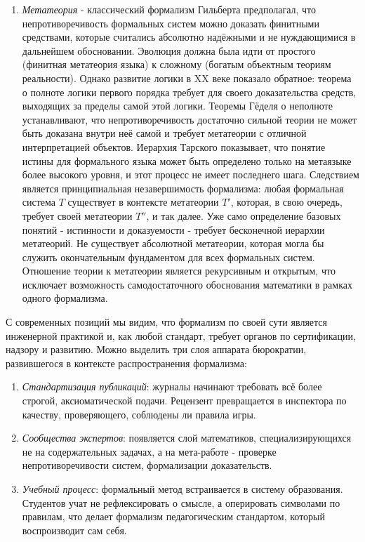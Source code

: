 \documentclass[12pt]{article}
\begin{document}
\begin{enumerate}
    \item {\it Метатеория} - классический формализм Гильберта предполагал, что непротиворечивость формальных систем можно доказать финитными средствами, которые считались абсолютно надёжными и не нуждающимися в дальнейшем обосновании. Эволюция должна была идти от простого (финитная метатеория языка) к сложному (богатым объектным теориям реальности). Однако развитие логики в XX веке показало обратное: теорема о полноте логики первого порядка требует для своего доказательства средств, выходящих за пределы самой этой логики. Теоремы Гёделя о неполноте устанавливают, что непротиворечивость достаточно сильной теории не может быть доказана внутри неё самой и требует метатеории с отличной интерпретацией объектов. Иерархия Тарского показывает, что понятие истины для формального языка может быть определено только на метаязыке более высокого уровня, и этот процесс не имеет последнего шага. Следствием является принципиальная незавершимость формализма: любая формальная система $T$ существует в контексте метатеории $T'$, которая, в свою очередь, требует своей метатеории $T''$, и так далее. Уже само определение базовых понятий - истинности и доказуемости - требует бесконечной иерархии метатеорий. Не существует абсолютной метатеории, которая могла бы служить окончательным фундаментом для всех формальных систем. Отношение теории к метатеории является рекурсивным и открытым, что исключает возможность самодостаточного обоснования математики в рамках одного формализма.
\end{enumerate}

С современных позиций мы видим, что формализм по своей сути является инженерной практикой и, как любой стандарт, требует органов по сертификации, надзору и развитию. Можно выделить три слоя аппарата бюрократии, развившегося в контексте распространения формализма:

\begin{enumerate}
    \item {\it Стандартизация публикаций}: журналы начинают требовать всё более строгой, аксиоматической подачи. Рецензент превращается в инспектора по качеству, проверяющего, соблюдены ли правила игры.
    \item {\it Сообщества экспертов}: появляется слой математиков, специализирующихся не на содержательных задачах, а на мета-работе - проверке непротиворечивости систем, формализации доказательств.
    \item {\it Учебный процесс}: формальный метод встраивается в систему образования. Студентов учат не рефлексировать о смысле, а оперировать символами по правилам, что делает формализм педагогическим стандартом, который воспроизводит сам себя.
\end{enumerate}
\end{document}
